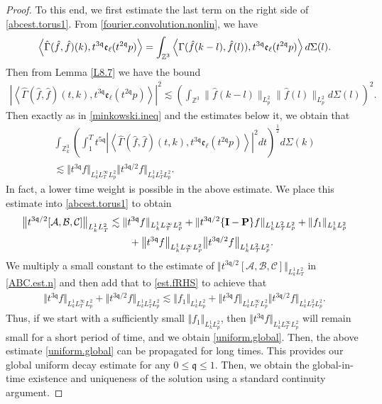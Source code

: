 \documentclass[reqno]{amsart}
\newcommand{\pv}{p}
\def\norm#1{\big\Vert#1\big\Vert}
\newcommand{\irnp}[2]{\left\langle {#1},{#2} \right\rangle}
\newcommand{\qq}{\mathfrak{q}}
\newcommand{\tqq}{t^{2\qq}}
\newcommand{\tTq}{t^{3\qq}}
\newcommand{\micro}{{\bf \{I- P\}}}
\newcommand{\Z}{\mathbb{Z}}
\theoremstyle{definition}
\numberwithin{equation}{section}
\numberwithin{theorem}{section}
\begin{document}
\begin{proof}
To this end, we first estimate the last term on the right side of \eqref{abcest.torus1}.  From \eqref{fourier.convolution.nonlin}, we have 
\begin{align}\notag
\irnp{\hat{\Gamma}(\hat{f},\hat{f})(k)}{\tTq{\mathfrak{e}_{\ell}(\tqq \pv)}}
=
\int_{\Z^3} \irnp{ \Gamma(\hat{f}(k-l),\hat{f}(l))}{\tTq{\mathfrak{e}_{\ell}(\tqq \pv)}}  d\Sigma(l).
\end{align}
Then from Lemma \ref{L8.7} we have the bound 
\begin{align*}
    \left\vert  \irnp{\hat{\Gamma}(\hat{f},\hat{f})(t,k)}{ \tTq{\mathfrak{e}_{\ell}(\tqq \pv)}} \right\vert^2
    \lesssim
   \left( \int_{\Z^3} \| \hat{f}(k-l)\|_{L^2_{\pv}} \| \hat{f}(l)\|_{L^2_{\pv}}  d\Sigma(l)\right)^2.
\end{align*}
Then exactly as in \eqref{minkowski.ineq} and the estimates below it, we obtain that 
\begin{multline*}
 \int_{\mathbb{Z}^3_k} \left( \int^{T}_{1} t^{5\qq}\left\vert  \irnp{\hat{\Gamma}(\hat{f},\hat{f})(t,k)}{ \tTq{\mathfrak{e}_{\ell}(\tqq \pv)}} \right\vert^2 dt \right)^{\frac12} d\Sigma (k)
 \\
    \lesssim
    \norm{\tTq{f}}_{L^1_kL^\infty_TL^2_{\pv}} \norm{t^{3\qq/2}{f}}_{L^1_kL^2_TL^2_{\pv}}.
\end{multline*}
In fact, a lower time weight is possible in the above estimate.
We place this estimate into \eqref{abcest.torus1} to obtain
\begin{align}\label{ABC.est.n}
\norm{t^{3\qq/2} [\mathcal{A},\mathcal{B},\mathcal{C}]}_{L^1_k L^2_T} 
&\lesssim
\Vert \tTq f \Vert_{L^1_k L^\infty_T L^2_{\pv}} +
\Vert t^{3\qq/2}\micro f \Vert_{L^1_k L^2_T L^2_{\pv}} + \Vert f_1 \Vert_{L^1_k L^2_{\pv}} \\ \notag
&\qquad+ 
    \norm{\tTq{f}}_{L^1_kL^\infty_TL^2_{\pv}} \norm{t^{3\qq/2}{f}}_{L^1_kL^2_TL^2_{\pv}}.
\end{align}
We multiply a small constant to the estimate of $\norm{t^{3\qq/2} [\mathcal{A},\mathcal{B},\mathcal{C}]}_{L^1_k L^2_T} $ in \eqref{ABC.est.n}  and then add that to \eqref{est.fRHS} to achieve that
\begin{align*}
    {\Vert{\tTq f}\Vert_{L^1_kL^\infty_TL^2_{\pv}}}
+
{\norm{t^{3\qq/2} f}_{L^1_kL^2_TL^2_{\pv}}}
\lesssim 
\norm{ {f}_1}_{L^1_kL^2_{\pv}}
+{\norm{\tTq f}_{L^1_kL^\infty_TL^2_{\pv}}} {\norm{t^{3\qq/2} f}_{L^1_kL^2_TL^2_{\pv}}}.
\end{align*}
Thus, if we start with a sufficiently small $\norm{ {f}_1}_{L^1_kL^2_{\pv}}$, then ${\norm{\tTq f}_{L^1_kL^\infty_TL^2_{\pv}}}$ will remain small for a short period of time, and we obtain \eqref{uniform.global}. Then, the above estimate \eqref{uniform.global} can be propagated for long times. This provides our global uniform decay estimate for any $0 \leq \qq \leq 1$. Then, we obtain the global-in-time existence and uniqueness of the solution using a standard continuity argument.
\end{proof}
\end{document}
